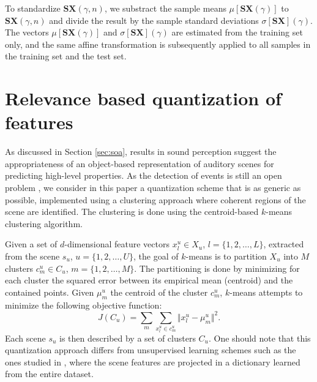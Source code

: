\documentclass[journal]{IEEEtran}
\begin{document}
To standardize $\mathbf{S}\boldsymbol{X}(\gamma,n)$, we substract the sample means $\mu[\mathbf{S}\boldsymbol{X}(\gamma)]$ to $\mathbf{S}\boldsymbol{X}(\gamma,n)$ and divide the result by the sample standard deviations $\sigma[\mathbf{S}\boldsymbol{X}] (\gamma)$.
The vectors $\mu[\mathbf{S}\boldsymbol{X}(\gamma)]$ and $\sigma[\mathbf{S}\boldsymbol{X}](\gamma)$ are estimated from the training set only, and the same affine transformation is subsequently applied to all samples in the training set and the test set.

\section{Relevance based quantization of features}
\label{sec:object}



As discussed in Section \ref{sec:soa}, results in sound perception suggest the appropriateness of an object-based representation of auditory scenes for predicting high-level properties. As the detection of events is still an open problem \cite{7100934},  we consider in this paper a quantization scheme that is as generic as possible, implemented using a clustering approach where coherent regions of the scene are identified. The clustering is done using the centroid-based $k$-means clustering algorithm.

Given a set of $d$-dimensional feature vectors $x_l^u\in X_u$, $l=\lbrace 1,2,\ldots,L\rbrace$, extracted from the scene $s_u$, $u=\lbrace 1,2,\ldots,U\rbrace$, the goal of $k$-means is to partition $X_u$ into $M$ clusters $c^u_m\in C_u$, $m=\lbrace 1,2,\ldots,M\rbrace$. The partitioning is done by minimizing for each cluster the squared error between its empirical mean (centroid) and the contained points. Given $\mu_m^u$ the centroid of the cluster $c_m^u$, $k$-means attempts to minimize the following objective function:
\begin{equation}
J(C_u)=\sum\limits_{m} \sum_{x^u_l\in c^u_m} \Vert x_l^u - \mu_m^u \Vert^2\mbox{.}
\end{equation}
Each scene $s_u$ is then described by a set of clusters $C_u$. One should note that this quantization approach differs from unsupervised learning schemes such as the ones studied in \cite{bisot2016acoustic}, where the scene features are projected in a dictionary learned from the entire dataset.
\end{document}

